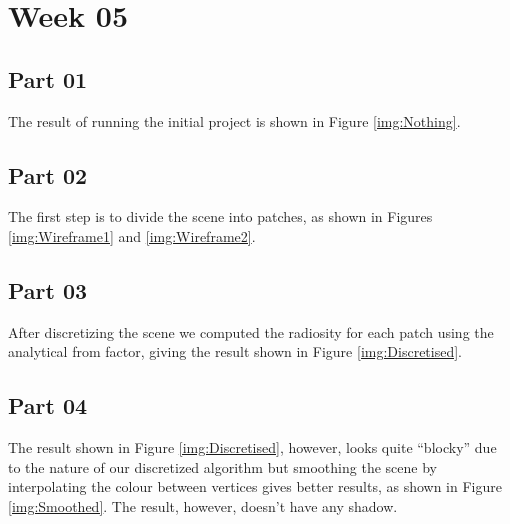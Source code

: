 \chapter{Week 05}

  \section {Part 01}

    The result of running the initial project is shown in Figure \ref{img:Nothing}.


  \section {Part 02}

    The first step is to divide the scene into patches, as shown in Figures \ref{img:Wireframe1}
    and \ref{img:Wireframe2}.
    

  \section {Part 03}

    After discretizing the scene we computed the radiosity for each patch using the analytical from factor, giving
    the result shown in Figure \ref{img:Discretised}. 

 
  \section {Part 04}
    
    The result shown in Figure \ref{img:Discretised}, however, looks quite ``blocky'' due to the nature
    of our discretized algorithm but smoothing the scene by interpolating the colour between vertices gives better
    results, as shown in Figure \ref{img:Smoothed}. The result, however, doesn't have any shadow.

    

